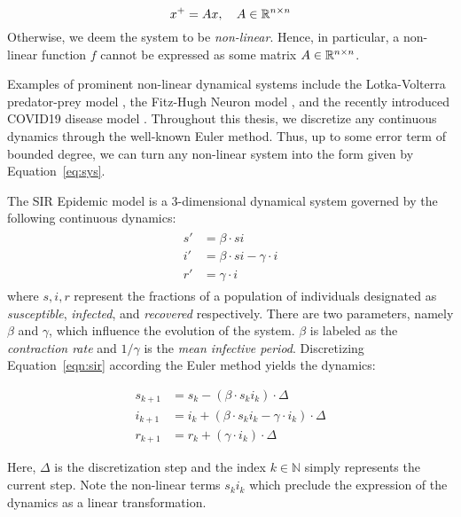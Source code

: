 $$
x^{+} = Ax, \quad A \in {\mathbb{R}}^{n \times n}
$$
%
Otherwise, we deem the system to be \emph{non-linear}.
%
Hence, in particular, a non-linear function $f$ cannot be expressed as some matrix $A \in {\mathbb{R}}^{n \times n}$.

Examples of prominent non-linear dynamical systems include the Lotka-Volterra predator-prey model \cite{wangersky1978lotka}, the Fitz-Hugh Neuron model \cite{fitzhugh1961impulses}, and the recently introduced COVID19 disease model \cite{indiansuper2020supermodel}. Throughout this thesis, we discretize any continuous dynamics through the well-known Euler method. Thus, up to some error term of bounded degree, we can turn any non-linear system into the form given by Equation~\ref{eq:sys}.
%
\begin{example}
The SIR Epidemic model is a 3-dimensional dynamical system governed by the following continuous dynamics:
\begin{align} \label{eqn:sir}
    \begin{split}
        s' &= \beta \cdot s i \\
        i' &= \beta \cdot s i - \gamma \cdot i \\
        r' &= \gamma \cdot i
    \end{split}
\end{align}
where $s,i,r$ represent the fractions of a population of individuals designated as \textit{susceptible}, \textit{infected}, and \textit{recovered} respectively. There are two parameters, namely $\beta$ and $\gamma$, which influence the evolution of the system. $\beta$ is labeled as the \emph{contraction rate} and $1/\gamma$ is the \emph{mean infective period}.
%
Discretizing Equation~\ref{eqn:sir} according the Euler method yields the dynamics:

\begin{center}
\label{fig:discrete_sir}
  \begin{equation*}
      \begin{split}
          s_{k+1} &= s_k - (\beta \cdot s_k i_k)\cdot\Delta \\
          i_{k+1} &= i_k + (\beta \cdot s_k i_k - \gamma \cdot i_k)\cdot\Delta \\
          r_{k+1} &= r_k + (\gamma\cdot i_k)\cdot\Delta
      \end{split}
  \end{equation*}
\end{center}
 Here, $\Delta$ is the discretization step and the index $k \in \mathbb{N}$ simply represents the current step.
%
Note the non-linear terms $s_ki_k$ which preclude the expression of the dynamics as a linear transformation.
\end{example}


